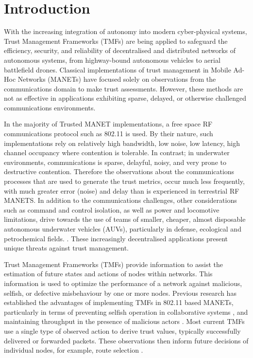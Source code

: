 \documentclass{aamas2016}
\begin{document}



\section{Introduction}
With the increasing integration of autonomy into modern cyber-physical systems, Trust Management Frameworks (TMFs) are being applied to safeguard the efficiency, security, and reliability of decentralised and distributed networks of autonomous systems, from highway-bound autonomous vehicles to aerial battlefield drones. 
Classical implementations of trust management in Mobile Ad-Hoc Networks (MANETs) have focused solely on observations from the communications domain to make trust assessments. 
However, these methods are not as effective in applications exhibiting sparse, delayed, or otherwise challenged communications environments\cite{Pavan2015}. 

In the majority of Trusted MANET implementations, a free space RF communications protocol such as 802.11 is used.
By their nature, such implementations rely on relatively high bandwidth, low noise, low latency, high channel occupancy where contention is tolerable.
In contrast; in underwater environments, communications is sparse, delayful, noisy, and very prone to destructive contention.
Therefore the observations about the communications processes that are used to generate the trust metrics, occur much less frequently, with much greater error (noise) and delay than is experienced in terrestrial RF MANETS.
In addition to the communications challenges, other considerations such as command and control isolation, as well as power and locomotive limitations, drive towards the use of teams of smaller, cheaper, almost disposable autonomous underwater vehicles (AUVs), particularly in defense, ecological and petrochemical fields.
. These increasingly decentralised applications present unique threats against trust management. 

Trust Management Frameworks (TMFs) provide information to assist the estimation of future states and actions of nodes within networks. This information is used to optimize the performance of a network against malicious, selfish, or defective misbehaviour by one or more nodes. Previous research has established the advantages of implementing TMFs in 802.11 based MANETs, particularly in terms of preventing selfish operation in collaborative systems \cite{Li2007}, and maintaining throughput in the presence of malicious actors \cite{Buchegger2002}. Most current TMFs use a single type of observed action to derive trust values, typically successfully delivered or forwarded packets. These observations then inform future decisions of individual nodes, for example, route selection \cite{Li2008}.
\end{document}
